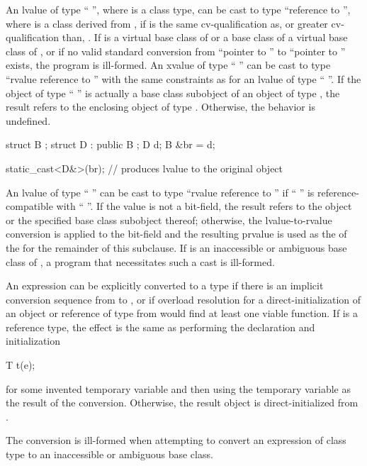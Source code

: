 \pnum
{}%
%
An lvalue of type `` '', where  is a class
type, can be cast to type ``reference to  '', where
 is a class derived from ,
if  is the
same cv-qualification as, or greater cv-qualification than,
. If  is a virtual base class of 
or a base class of a virtual base class of ,
or if no valid standard conversion from ``pointer to ''
to ``pointer to '' exists, the program is ill-formed.
An xvalue of type
`` '' can be cast to type ``rvalue reference to
 '' with the same constraints as for an lvalue of
type `` ''. If the object
of type `` '' is actually a base class subobject of an object
of type , the result refers to the enclosing object of type
. Otherwise, the behavior is undefined.
\begin{example}

\begin{codeblock}
struct B { };
struct D : public B { };
D d;
B &br = d;

static_cast<D&>(br);            // produces lvalue to the original  object
\end{codeblock}
\end{example}

\pnum
An lvalue
of type `` '' can be cast to type ``rvalue
reference to  '' if `` '' is
reference-compatible with ``
''. If the value is not a bit-field,
the result refers to the object or the specified base class subobject
thereof; otherwise, the lvalue-to-rvalue conversion
is applied to the bit-field and the resulting prvalue is used as the
 of the  for the remainder of this subclause.
If  is an inaccessible or
ambiguous base class of ,
a program that necessitates such a cast is ill-formed.

\pnum
An expression  can be explicitly converted to a type 
if there is an implicit conversion sequence
from  to , or
if overload resolution for a direct-initialization
of an object or reference of type  from 
would find at least one viable function.
If  is a reference type, the effect is
the same as performing the declaration and initialization
\begin{codeblock}
 T t(e);
\end{codeblock}
for some invented temporary variable 
and then using the temporary variable as the result of the conversion.
Otherwise, the result object is direct-initialized from .
\begin{note}
The conversion is ill-formed when attempting to convert an
expression of class type to an inaccessible or ambiguous base class.
\end{note}

